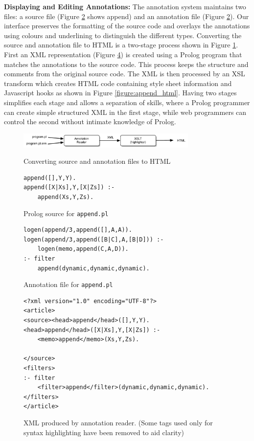 \documentclass{sig-alternate}
\begin{document}
{\bf Displaying and Editing Annotations:}
The annotation system maintains two files: a source file (Figure
\ref{figure:append} shows append) and an annotation file (Figure
\ref{figure:append}). Our interface preserves the formatting of the source code
and overlays the annotations using colours and underlining to distinguish the
different types. Converting the source and annotation file to HTML is a
two-stage process shown in Figure \ref{figure:ann2html}. First an XML
representation (Figure \ref{figure:append_xml}) is created using a Prolog program that matches the annotations
to the source code. This process keeps the structure and comments from the
original source code. The XML is then processed by an XSL transform which
creates HTML code containing style sheet information and Javascript hooks as shown
in Figure \ref{figure:append_html}. Having
two stages simplifies each stage and allows a separation of skills, where a
Prolog programmer can create simple structured XML in the first stage, while
web programmers can control the second without intimate knowledge of Prolog.

\begin{figure}[htb]
\begin{center}
\includegraphics[width=3.5in]{ann2html}
\end{center}
\caption{Converting source and annotation files to HTML}
\protect\label{figure:ann2html}
\end{figure}

\begin{figure}[htb]
\begin{verbatim}
append([],Y,Y).
append([X|Xs],Y,[X|Zs]) :-
    append(Xs,Y,Zs).
\end{verbatim}
\caption{Prolog source for \texttt{append.pl}}
\protect\label{figure:append}
\end{figure}

\begin{figure}[htb]
\begin{verbatim}
logen(append/3,append([],A,A)).
logen(append/3,append([B|C],A,[B|D])) :-
    logen(memo,append(C,A,D)).
:- filter
    append(dynamic,dynamic,dynamic).
\end{verbatim}
\caption{Annotation file for \texttt{append.pl}}
\protect\label{figure:append_ann}
\end{figure}

\begin{figure}[htb]
\begin{verbatim}
<?xml version="1.0" encoding="UTF-8"?>
<article>
<source><head>append</head>([],Y,Y).
<head>append</head>([X|Xs],Y,[X|Zs]) :-
    <memo>append</memo>(Xs,Y,Zs).

</source>
<filters>
:- filter
    <filter>append</filter>(dynamic,dynamic,dynamic).
</filters>
</article>
\end{verbatim}
\caption{XML produced by annotation reader. (Some tags used only for syntax
highlighting have been removed to aid clarity)}
\protect\label{figure:append_xml}
\end{figure}
\end{document}
